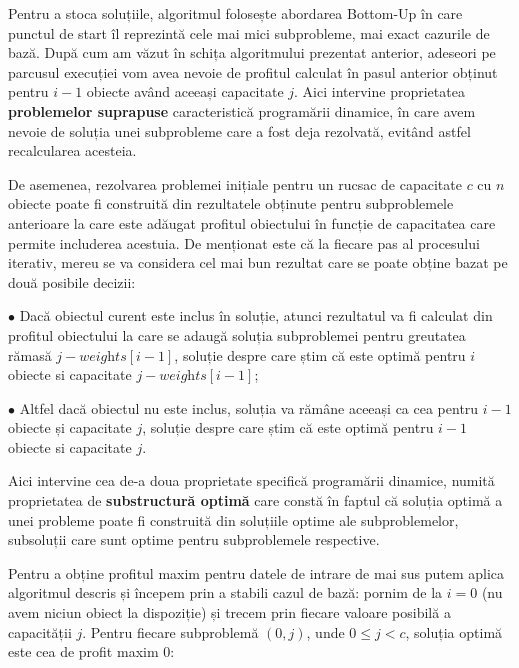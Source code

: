 \begin{sloppypar}
Pentru a stoca soluțiile, algoritmul folosește abordarea Bottom-Up în care punctul de start îl reprezintă cele mai mici subprobleme, mai exact cazurile de bază. După cum am văzut în schița algoritmului prezentat anterior, adeseori pe parcusul execuției vom avea nevoie de profitul calculat în pasul anterior obținut pentru $i - 1$ obiecte având aceeași capacitate $j$. Aici intervine proprietatea \textbf{problemelor suprapuse} caracteristică programării dinamice, în care avem nevoie de soluția unei subprobleme care a fost deja rezolvată, evitând astfel recalcularea acesteia. \par
De asemenea, rezolvarea problemei inițiale pentru un rucsac de capacitate $c$ cu $n$ obiecte poate fi construită din rezultatele obținute pentru subproblemele anterioare la care este adăugat profitul obiectului în funcție de capacitatea care permite includerea acestuia. De menționat este că la fiecare pas al procesului iterativ, mereu se va considera cel mai bun rezultat care se poate obține bazat pe două posibile decizii: \par
$\bullet$ Dacă obiectul curent este inclus în soluție, atunci rezultatul va fi calculat din profitul obiectului la care se adaugă soluția subproblemei pentru greutatea rămasă $j - \textit{weights}[i - 1]$, soluție despre care știm că este optimă pentru $i$ obiecte si capacitate $j - \textit{weights}[i - 1]$; \par
$\bullet$ Altfel dacă obiectul nu este inclus, soluția va rămâne aceeași ca cea pentru $i - 1$ obiecte și capacitate $j$, soluție despre care știm că este optimă pentru $i - 1$ obiecte si capacitate $j$. \par
Aici intervine cea de-a doua proprietate specifică programării dinamice, numită proprietatea de \textbf{substructură optimă} care constă în faptul că soluția optimă a unei probleme poate fi construită din soluțiile optime ale subproblemelor, subsoluții care sunt optime pentru subproblemele respective.
\\ \par
Pentru a obține profitul maxim pentru datele de intrare de mai sus putem aplica algoritmul descris și începem prin a stabili cazul de bază: pornim de la $i = 0$ (nu avem niciun obiect la dispoziție) și trecem prin fiecare valoare posibilă a capacității $j$. Pentru fiecare subproblemă $(0, j)$, unde $0 \le j < c $, soluția optimă este cea de profit maxim 0:



\end{sloppypar}
